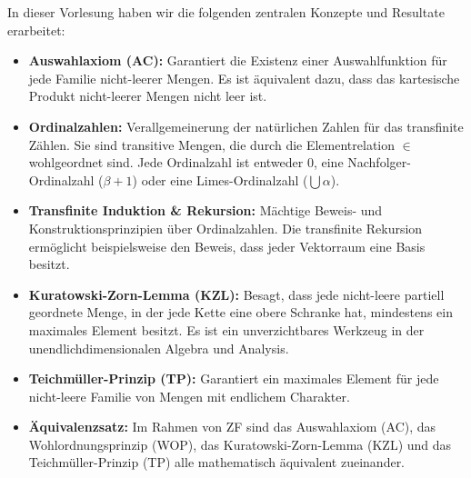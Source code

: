 \begin{nice-box}
In dieser Vorlesung haben wir die folgenden zentralen Konzepte und Resultate erarbeitet:
\begin{itemize}
    \item \textbf{Auswahlaxiom (AC):} Garantiert die Existenz einer Auswahlfunktion für jede Familie nicht-leerer Mengen. Es ist äquivalent dazu, dass das kartesische Produkt nicht-leerer Mengen nicht leer ist.
    \item \textbf{Ordinalzahlen:} Verallgemeinerung der natürlichen Zahlen für das transfinite Zählen. Sie sind transitive Mengen, die durch die Elementrelation $\in$ wohlgeordnet sind. Jede Ordinalzahl ist entweder $0$, eine Nachfolger-Ordinalzahl ($\beta + 1$) oder eine Limes-Ordinalzahl ($\bigcup \alpha$).
    \item \textbf{Transfinite Induktion \& Rekursion:} Mächtige Beweis- und Konstruktionsprinzipien über Ordinalzahlen. Die transfinite Rekursion ermöglicht beispielsweise den Beweis, dass jeder Vektorraum eine Basis besitzt.
    \item \textbf{Kuratowski-Zorn-Lemma (KZL):} Besagt, dass jede nicht-leere partiell geordnete Menge, in der jede Kette eine obere Schranke hat, mindestens ein maximales Element besitzt. Es ist ein unverzichtbares Werkzeug in der unendlichdimensionalen Algebra und Analysis.
    \item \textbf{Teichmüller-Prinzip (TP):} Garantiert ein maximales Element für jede nicht-leere Familie von Mengen mit endlichem Charakter.
    \item \textbf{Äquivalenzsatz:} Im Rahmen von ZF sind das Auswahlaxiom (AC), das Wohlordnungsprinzip (WOP), das Kuratowski-Zorn-Lemma (KZL) und das Teichmüller-Prinzip (TP) alle mathematisch äquivalent zueinander.
\end{itemize}
\end{nice-box}

